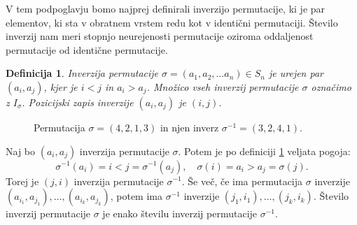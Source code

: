 \documentclass[a4paper, 12pt]{book}
\newtheorem{definicija}{Definicija}[chapter]
\begin{document}
V tem podpoglavju bomo najprej definirali inverzijo permutacije, ki je par elementov, ki sta v obratnem vrstem redu kot v identični permutaciji. Število inverzij nam meri stopnjo neurejenosti permutacije oziroma oddaljenost permutacije od identične permutacije. 

\begin{definicija}
\label{definicija_inverzije}
    Inverzija permutacije $\sigma = (a_1, a_2,\dots a_n) \in S_n$ je urejen par $(a_i, a_j)$, kjer je $i < j$ in $a_i > a_j$. Množico vseh inverzij permutacije $\sigma$ označimo z $I_{\sigma}$. Pozicijski zapis inverzije $(a_i, a_j)$ je $(i, j)$.
\end{definicija}

\begin{figure}[h]
    \begin{center}
    \end{center}
    \caption{Permutacija $\sigma = (4, 2, 1, 3)$ in njen inverz $\sigma^{-1} = (3, 2, 4, 1)$.}
    \label{permutacija_4213}
\end{figure}

Naj bo $(a_i, a_j)$ inverzija permutacije $\sigma$. Potem je po definiciji \ref{definicija_inverzije} veljata pogoja: 
\[
    \sigma^{-1}(a_i) = i < j = \sigma^{-1}(a_j), \quad \sigma(i) = a_i > a_j = \sigma(j).
\]
Torej je $(j, i)$ inverzija permutacije $\sigma^{-1}$.
Še več, če ima permutacija $\sigma$ inverzije $(a_{i_1}, a_{j_1}), \dots, (a_{i_k}, a_{j_k})$, potem ima $\sigma^{-1}$ inverzije $(j_1, i_1), \dots, (j_k, i_k)$. 
Število inverzij permutacije $\sigma$ je enako številu inverzij permutacije $\sigma^{-1}$.
\end{document}
